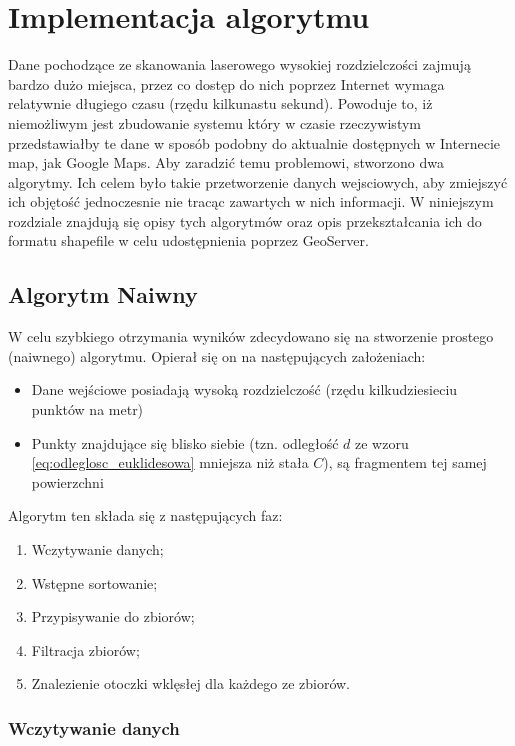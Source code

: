 \chapter{Implementacja algorytmu}
\label{chap:implementacja}

Dane pochodzące ze skanowania laserowego wysokiej rozdzielczości zajmują bardzo dużo miejsca, przez co
dostęp do nich poprzez Internet wymaga relatywnie długiego czasu (rzędu kilkunastu sekund). Powoduje to,
iż niemożliwym jest zbudowanie systemu który w czasie rzeczywistym przedstawiałby te dane w sposób podobny
do aktualnie dostępnych w Internecie map, jak Google Maps. Aby zaradzić temu problemowi, stworzono dwa algorytmy.
Ich celem było takie przetworzenie danych wejsciowych, aby zmiejszyć ich objętość jednoczesnie nie tracąc zawartych w nich informacji.
W niniejszym rozdziale znajdują się opisy tych algorytmów oraz opis przekształcania ich do formatu shapefile w celu udostępnienia
poprzez GeoServer.

\section{Algorytm Naiwny}

W celu szybkiego otrzymania wyników zdecydowano się na stworzenie prostego (naiwnego) algorytmu. Opierał się on na następujących założeniach:
\begin{itemize}
    \item Dane wejściowe posiadają wysoką rozdzielczość (rzędu kilkudziesieciu punktów na metr)
    \item Punkty znajdujące się blisko siebie (tzn. odległość $d$ ze wzoru \ref{eq:odleglosc_euklidesowa} mniejsza niż stała $C$), są fragmentem tej samej powierzchni
\end{itemize}

\noindent Algorytm ten składa się z następujących faz:
\begin{enumerate}
    \item Wczytywanie danych;
    \item Wstępne sortowanie;
    \item Przypisywanie do zbiorów;
    \item Filtracja zbiorów;
    \item Znalezienie otoczki wklęsłej dla każdego ze zbiorów.
\end{enumerate}

\subsection{Wczytywanie danych}

